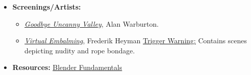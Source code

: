 \begin{itemize}[noitemsep,topsep=0pt,leftmargin=*]
\begin{itemize}
            \end{itemize}
      \item \textbf{Screenings/Artists:}
            \begin{itemize}
                  \item \href{https://alanwarburton.co.uk/goodbye-uncanny-valley}{\emph{Goodbye Uncanny Valley}}, Alan Warburton.
                  \item \href{https://www.nowness.com/story/virtual-embalming-frederik-heyman}{\emph{Virtual Embalming}}, Frederik Heyman \newline
                        \small{\ul{Trigger Warning:} Contains scenes depicting nudity and rope bondage.}
            \end{itemize}
      \item \textbf{Resources:} \href{https://cloud.blender.org/p/blender-fundamentals/}{Blender Fundamentals}
\end{itemize}
